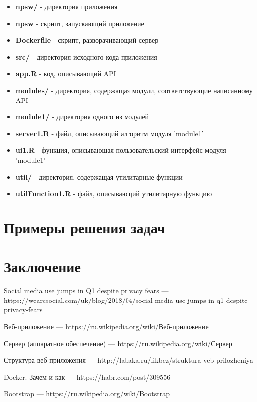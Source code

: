 \documentclass[14pt,a4paper]{scrartcl}
\begin{document}
    \begin{itemize}
        \item \textbf{npsw/}  - директория приложения
        \item \textbf{npsw} - скрипт, запускающий приложение
        \item \textbf{Dockerfile} - скрипт, разворачивающий сервер
        \item \textbf{src/} - директория исходного кода приложения
        \item \textbf{app.R} - код, описывающий API
        \item \textbf{modules/} - директория, содержащая модули, соответствующие написанному API
        \item \textbf{module1/} - директория одного из модулей
        \item \textbf{server1.R} - файл, описывающий алгоритм модуля 'module1'
        \item \textbf{ui1.R} - функция, описывающая пользовательский интерфейс модуля 'module1'
        \item \textbf{util/} - директория, содержащая утилитарные функции
        \item \textbf{utilFunction1.R} - файл, описывающий утилитарную функцию
    \end{itemize}

    \newpage
    \section[Примеры решения задач]{Примеры решения задач}

    \newpage
    \section[Заключение]{Заключение}

    \newpage
    \begin{thebibliography}{9}
        Social media use jumps in Q1 despite privacy fears
        \newblock --- https://wearesocial.com/uk/blog/2018/04/social-media-use-jumps-in-q1-despite-privacy-fears

        Веб-приложение
        \newblock --- https://ru.wikipedia.org/wiki/Веб-приложение

        Сервер (аппаратное обеспечение)
        \newblock --- https://ru.wikipedia.org/wiki/Сервер

        Структура веб-приложения
        \newblock --- http://labaka.ru/likbez/struktura-veb-prilozheniya

        Docker. Зачем и как
        \newblock --- https://habr.com/post/309556

        Bootstrap
        \newblock --- https://ru.wikipedia.org/wiki/Bootstrap

    \end{thebibliography}
\end{document}
